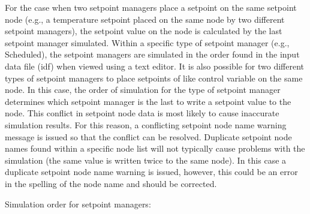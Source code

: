 For the case when two setpoint managers place a setpoint on the same setpoint node (e.g., a temperature setpoint placed on the same node by two different setpoint managers), the setpoint value on the node is calculated by the last setpoint manager simulated. Within a specific type of setpoint manager (e.g., Scheduled), the setpoint managers are simulated in the order found in the input data file (idf) when viewed using a text editor. It is also possible for two different types of setpoint managers to place setpoints of like control variable on the same node. In this case, the order of simulation for the type of setpoint manager determines which setpoint manager is the last to write a setpoint value to the node. This conflict in setpoint node data is most likely to cause inaccurate simulation results. For this reason, a conflicting setpoint node name warning message is issued so that the conflict can be resolved. Duplicate setpoint node names found within a specific node list will not typically cause problems with the simulation (the same value is written twice to the same node). In this case a duplicate setpoint node name warning is issued, however, this could be an error in the spelling of the node name and should be corrected.

Simulation order for setpoint managers:


